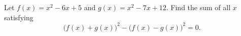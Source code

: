 Let $f(x)=x^2-6x+5$ and $g(x)=x^2-7x+12$. Find the sum of all $x$ satisfying
\[
\bigl(f(x)+g(x)\bigr)^2-\bigl(f(x)-g(x)\bigr)^2=0 .
\]
